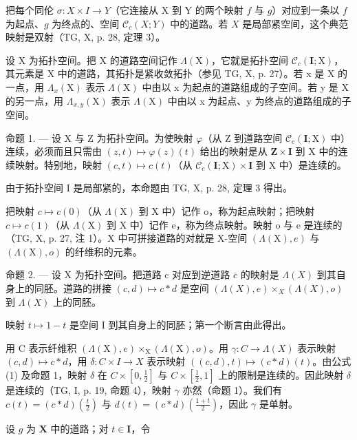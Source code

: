 把每个同伦 \(\sigma\colon X \times I \to Y\)（它连接从 X 到 Y 的两个映射 \(f\) 与 \(g\)）对应到一条以 \(f\) 为起点、\(g\) 为终点的、空间 \(\mathcal{C}_c(X;Y)\) 中的道路。若 \(X\) 是局部紧空间，这个典范映射是双射（TG, X, p. 28, 定理 3）。

设 X 为拓扑空间。把 X 的道路空间记作 \(\Lambda(\mathrm{X})\)，它就是拓扑空间 \(\mathcal{C}_{c}(\mathbf{I};\mathrm{X})\)，其元素是 X 中的道路，其拓扑是紧收敛拓扑（参见 TG, X, p. 27）。若 x 是 X 的一点，用 \(\Lambda_{x}(\mathrm{X})\) 表示 \(\Lambda(\mathrm{X})\) 中由以 x 为起点的道路组成的子空间。若 y 是 X 的另一点，用 \(\Lambda_{x,y}(\mathrm{X})\) 表示 \(\Lambda(\mathrm{X})\) 中由以 x 为起点、y 为终点的道路组成的子空间。

命题 1. --- 设 X 与 Z 为拓扑空间。为使映射 \(\varphi\)（从 Z 到道路空间 \(\mathcal{C}_c(\mathbf{I};\mathrm{X})\) 中）连续，必须而且只需由 \((z,t)\mapsto \varphi (z)(t)\) 给出的映射是从 \(\mathbf{Z}\times \mathbf{I}\) 到 X 中的连续映射。特别地，映射 \((c,t)\mapsto c(t)\)（从 \(\mathcal{C}_c(\mathbf{I};\mathrm{X})\times \mathbf{I}\) 到 X 中）是连续的。

由于拓扑空间 I 是局部紧的，本命题由 TG, X, p. 28, 定理 3 得出。

把映射 \(c \mapsto c(0)\)（从 \(\Lambda(\mathrm{X})\) 到 X 中）记作 o，称为起点映射；把映射 \(c \mapsto c(1)\)（从 \(\Lambda(\mathrm{X})\) 到 X 中）记作 e，称为终点映射。映射 o 与 e 是连续的（TG, X, p. 27, 注 1）。X 中可拼接道路的对就是 X-空间 \((\Lambda(\mathrm{X}), e)\) 与 \((\Lambda(\mathrm{X}), o)\) 的纤维积的元素。

命题 2. --- 设 X 为拓扑空间。把道路 c 对应到逆道路 \(\overline{c}\) 的映射是 \(\Lambda(X)\) 到其自身上的同胚。道路的拼接 \((c,d)\mapsto c*d\) 是空间 \((\Lambda(X),e)\times_{X}(\Lambda(X),o)\) 到 \(\Lambda(X)\) 上的同胚。

映射 \(t \mapsto 1 - t\) 是空间 I 到其自身上的同胚；第一个断言由此得出。

用 C 表示纤维积 \((\Lambda(\mathrm{X}),e)\times_{\mathrm{X}}(\Lambda(\mathrm{X}),o)\)。用 \(\gamma:C\to\Lambda(X)\) 表示映射 \((c,d)\mapsto c*d\)，用 \(\delta:C\times I\to X\) 表示映射 \(((c,d),t)\mapsto(c*d)(t)\)。由公式 (1) 及命题 1，映射 \(\delta\) 在 \(C\times[0,\frac{1}{2}]\) 与 \(C\times[\frac{1}{2},1]\) 上的限制是连续的。因此映射 \(\delta\) 是连续的（TG, I, p. 19, 命题 4），映射 \(\gamma\) 亦然（命题 1）。我们有 \(c(t)=(c*d)(\frac{t}{2})\) 与 \(d(t)=(c*d)(\frac{1+t}{2})\)，因此 \(\gamma\) 是单射。

设 \(g\) 为 \(\mathbf{X}\) 中的道路；对 \(t \in \mathbf{I}\)，令

